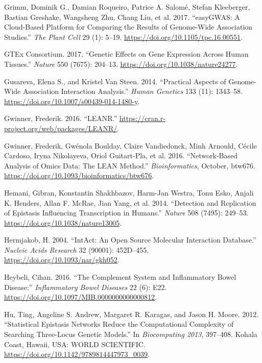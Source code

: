 \documentclass[
  11pt,
]{env/yjiao}
\newlength{\cslhangindent}
\newenvironment{cslreferences}%
  {\setlength{\parindent}{0pt}%
  \everypar{\setlength{\hangindent}{\cslhangindent}}\ignorespaces}%
  {\par}
\begin{document}
\begin{cslreferences}
\leavevmode\hypertarget{ref-grimm_easygwas_2017}{}%
Grimm, Dominik G., Damian Roqueiro, Patrice A. Salomé, Stefan Kleeberger, Bastian Greshake, Wangsheng Zhu, Chang Liu, et al. 2017. ``easyGWAS: A Cloud-Based Platform for Comparing the Results of Genome-Wide Association Studies.'' \emph{The Plant Cell} 29 (1): 5--19. \url{https://doi.org/10.1105/tpc.16.00551}.

\leavevmode\hypertarget{ref-gtex_consortium_genetic_2017}{}%
GTEx Consortium. 2017. ``Genetic Effects on Gene Expression Across Human Tissues.'' \emph{Nature} 550 (7675): 204--13. \url{https://doi.org/10.1038/nature24277}.

\leavevmode\hypertarget{ref-gusareva_practical_2014}{}%
Gusareva, Elena S., and Kristel Van Steen. 2014. ``Practical Aspects of Genome-Wide Association Interaction Analysis.'' \emph{Human Genetics} 133 (11): 1343--58. \url{https://doi.org/10.1007/s00439-014-1480-y}.

\leavevmode\hypertarget{ref-leanr}{}%
Gwinner, Frederik. 2016. ``LEANR.'' \url{https://cran.r-project.org/web/packages/LEANR/}.

\leavevmode\hypertarget{ref-gwinner_network-based_2016}{}%
Gwinner, Frederik, Gwénola Boulday, Claire Vandiedonck, Minh Arnould, Cécile Cardoso, Iryna Nikolayeva, Oriol Guitart-Pla, et al. 2016. ``Network-Based Analysis of Omics Data: The LEAN Method.'' \emph{Bioinformatics}, October, btw676. \url{https://doi.org/10.1093/bioinformatics/btw676}.

\leavevmode\hypertarget{ref-hemani_detection_2014}{}%
Hemani, Gibran, Konstantin Shakhbazov, Harm-Jan Westra, Tonu Esko, Anjali K. Henders, Allan F. McRae, Jian Yang, et al. 2014. ``Detection and Replication of Epistasis Influencing Transcription in Humans.'' \emph{Nature} 508 (7495): 249--53. \url{https://doi.org/10.1038/nature13005}.

\leavevmode\hypertarget{ref-hermjakob_intact_2004}{}%
Hermjakob, H. 2004. ``IntAct: An Open Source Molecular Interaction Database.'' \emph{Nucleic Acids Research} 32 (90001): 452D--455. \url{https://doi.org/10.1093/nar/gkh052}.

\leavevmode\hypertarget{ref-heybeli_complement_2016}{}%
Heybeli, Cihan. 2016. ``The Complement System and Inflammatory Bowel Disease:'' \emph{Inflammatory Bowel Diseases} 22 (6): E22. \url{https://doi.org/10.1097/MIB.0000000000000812}.

\leavevmode\hypertarget{ref-hu_statistical_2012}{}%
Hu, Ting, Angeline S. Andrew, Margaret R. Karagas, and Jason H. Moore. 2012. ``Statistical Epistasis Networks Reduce the Computational Complexity of Searching Three-Locus Genetic Models.'' In \emph{Biocomputing 2013}, 397--408. Kohala Coast, Hawaii, USA: WORLD SCIENTIFIC. \url{https://doi.org/10.1142/9789814447973_0039}.


\end{cslreferences}
\end{document}
